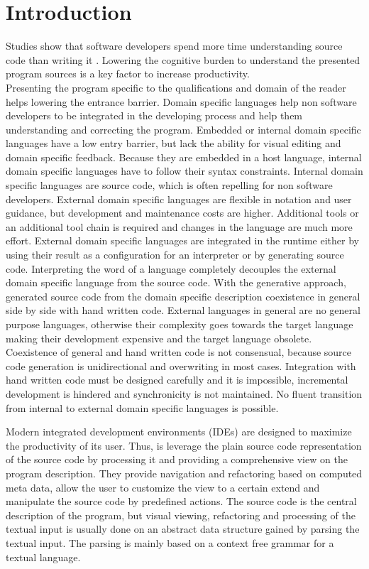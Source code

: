 \chapter{Introduction}
\label{cha:introduction}
Studies show that software developers spend more time understanding source code than writing it \cite{uistudy}. Lowering the cognitive burden to understand the presented program sources is a key factor to increase productivity. \\

Presenting the program specific to the qualifications and domain of the reader helps lowering the entrance barrier. Domain specific languages help non software developers to be integrated in the developing process and help them understanding and correcting the program. Embedded or internal domain specific languages have a low entry barrier, but lack the ability for visual editing and domain specific feedback. Because they are embedded in a host language, internal domain specific languages have to follow their syntax constraints. Internal domain specific languages are source code, which is often repelling for non software developers. External domain specific languages are flexible in notation and user guidance, but development and maintenance costs are higher. Additional tools or an additional tool chain is required and changes in the language are much more effort. External domain specific languages are integrated in the runtime either by using their result as a configuration for an interpreter or by generating source code. Interpreting the word of a language completely decouples the external domain specific language from the source code. With the generative approach, generated source code from the domain specific description coexistence in general side by side with hand written code. External languages in general are no general purpose languages, otherwise their complexity goes towards the target language making their development expensive and the target language obsolete. Coexistence of general and hand written code is not consensual, because source code generation is unidirectional and overwriting in most cases. Integration with hand written code must be designed carefully and it is impossible, incremental development is hindered and synchronicity is not maintained. No fluent transition from internal to external domain specific languages is possible.   

Modern integrated development environments (IDEs) are designed to maximize the productivity of its user. Thus, is leverage the plain source code representation of the source code by processing it and providing a comprehensive view on the program description. They provide navigation and refactoring based on computed meta data, allow the user to customize the view to a certain extend and manipulate the source code by predefined actions. The source code is the central description of the program, but visual viewing, refactoring and processing of the textual input is usually done on an abstract data structure gained by parsing the textual input. The parsing is mainly based on a context free grammar for a textual language. 

